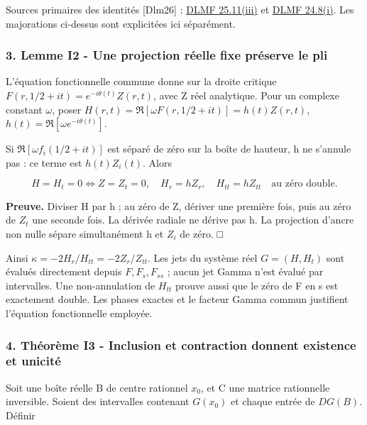 \documentclass[
  10pt,
  a4paper,
]{article}
\begin{document}
Sources primaires des identités {[}Dlm26{]} :
\href{https://dlmf.nist.gov/25.11.iii}{DLMF 25.11(iii)} et
\href{https://dlmf.nist.gov/24.8.i}{DLMF 24.8(i)}. Les majorations
ci-dessus sont explicitées ici séparément.

\hypertarget{lemme-i2---une-projection-ruxe9elle-fixe-pruxe9serve-le-pli}{%
\subsubsection{3. Lemme I2 - Une projection réelle fixe préserve le
pli}\label{lemme-i2---une-projection-ruxe9elle-fixe-pruxe9serve-le-pli}}

L'équation fonctionnelle commune donne sur la droite critique
\(F(r,1/2+it)=e^{-i\theta(t)}Z(r,t)\), avec Z réel analytique. Pour un
complexe constant \(\omega\), poser
\(H(r,t)=\Re[\omega F(r,1/2+it)]=h(t)Z(r,t)\),
\(h(t)=\Re[\omega e^{-i\theta(t)}]\).

Si \(\Re[\omega f_i(1/2+it)]\) est séparé de zéro sur la boîte de
hauteur, h ne s'annule pas : ce terme est \(h(t)Z_i(t)\). Alors

\[
H=H_t=0\iff Z=Z_t=0,
\quad H_r=hZ_r,\quad H_{tt}=hZ_{tt}
\quad\text{au zéro double}.
\]

\textbf{Preuve.} Diviser H par h ; au zéro de Z, dériver une première
fois, puis au zéro de \(Z_t\) une seconde fois. La dérivée radiale ne
dérive pas h. La projection d'ancre non nulle sépare simultanément h et
\(Z_i\) de zéro. □

Ainsi \(\kappa=-2H_r/H_{tt}=-2Z_r/Z_{tt}\). Les jets du système réel
\(G=(H,H_t)\) sont évalués directement depuis \(F,F_s,F_{ss}\) ; aucun
jet Gamma n'est évalué par intervalles. Une non-annulation de \(H_{tt}\)
prouve aussi que le zéro de F en s est exactement double. Les phases
exactes et le facteur Gamma commun justifient l'équation fonctionnelle
employée.

\hypertarget{thuxe9oruxe8me-i3---inclusion-et-contraction-donnent-existence-et-unicituxe9}{%
\subsubsection{4. Théorème I3 - Inclusion et contraction donnent
existence et
unicité}\label{thuxe9oruxe8me-i3---inclusion-et-contraction-donnent-existence-et-unicituxe9}}

Soit une boîte réelle B de centre rationnel \(x_0\), et C une matrice
rationnelle inversible. Soient des intervalles contenant \(G(x_0)\) et
chaque entrée de \(DG(B)\). Définir
\end{document}
